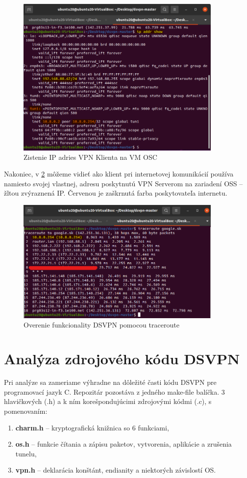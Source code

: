 \begin{figure}
	\centering
	\includegraphics[width=0.9\textwidth]{figures/ipu20}
	\caption{Zistenie IP adries VPN Klienta na VM OSC}
	\label{ipu20}
\end{figure}
Nakoniec, v \ref{vpntru20} môžeme vidieť ako klient pri internetovej komunikácií používa namiesto svojej vlastnej, adresu poskytnutú VPN Serverom na zariadení OSS -- žltou zvýraznená IP. Červenou je zaškrnutá farba poskytovateľa internetu. 

\begin{figure}
	\centering
	\includegraphics[width=0.9\textwidth]{figures/vpntru20}
	\caption{Overenie funkcionality DSVPN pomocou traceroute}
	\label{vpntru20}
\end{figure}
 \section{Analýza zdrojového kódu DSVPN}
 Pri analýze sa zameriame výhradne na dôležité časti kódu DSVPN pre programovací jazyk C. Repozitár pozostáva z jedného make-file balíčka\cite{make}. 3 hlavičkových (.h) a k ním korešpondujúcimi zdrojovými kódmi (.c), s pomenovaním:
 \begin{enumerate}
 	\item \textbf{charm.h} -- kryptografická knižnica so 6 funkciami,
 	\item \textbf{os.h} -- funkcie čítania a zápisu paketov, vytvorenia, aplikácie a zrušenia tunelu,
 	\item \textbf{vpn.h} -- deklarácia konštánt, endianity\cite{endianita} a niektorých závislostí OS.
 \end{enumerate}

